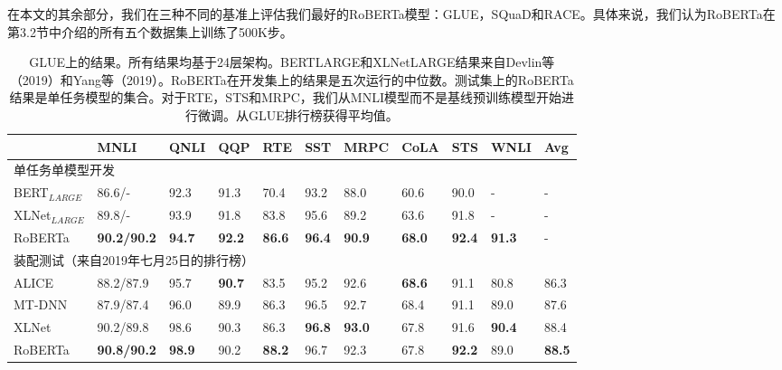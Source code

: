 \documentclass[lang=cn,11pt,a4paper,twocolumn]{elegantpaper}
\begin{document}
在本文的其余部分，我们在三种不同的基准上评估我们最好的RoBERTa模型：GLUE，SQuaD和RACE。具体来说，我们认为RoBERTa在第3.2节中介绍的所有五个数据集上训练了500K步。
\begin{table*}[]
  \centering
  \begin{tabular}{lllllllllll}
  \hline
  \textbf{}       & \textbf{MNLI}      & \textbf{QNLI} & \textbf{QQP}  & \textbf{RTE}  & \textbf{SST}  & \textbf{MRPC} & \textbf{CoLA} & \textbf{STS}  & \textbf{WNLI} & \textbf{Avg}  \\ \hline
  \multicolumn{11}{l}{单任务单模型开发}                                                                                                                                                        \\
  BERT$_{LARGE}$  & 86.6/-             & 92.3          & 91.3          & 70.4          & 93.2          & 88.0          & 60.6          & 90.0          & -             & -             \\
  XLNet$_{LARGE}$ & 89.8/-             & 93.9          & 91.8          & 83.8          & 95.6          & 89.2          & 63.6          & 91.8          & -             & -             \\
  RoBERTa         & \textbf{90.2/90.2} & \textbf{94.7} & \textbf{92.2} & \textbf{86.6} & \textbf{96.4} & \textbf{90.9} & \textbf{68.0} & \textbf{92.4} & \textbf{91.3} & -             \\ \hline
  \multicolumn{11}{l}{装配测试（来自2019年七月25日的排行榜）}                                                                                                                                          \\
  ALICE           & 88.2/87.9          & 95.7          & \textbf{90.7} & 83.5          & 95.2          & 92.6          & \textbf{68.6} & 91.1          & 80.8          & 86.3          \\
  MT-DNN          & 87.9/87.4          & 96.0          & 89.9          & 86.3          & 96.5          & 92.7          & 68.4          & 91.1          & 89.0          & 87.6          \\
  XLNet           & 90.2/89.8          & 98.6          & 90.3          & 86.3          & \textbf{96.8} & \textbf{93.0} & 67.8          & 91.6          & \textbf{90.4} & 88.4          \\
  RoBERTa         & \textbf{90.8/90.2} & \textbf{98.9} & 90.2          & \textbf{88.2} & 96.7          & 92.3          & 67.8          & \textbf{92.2} & 89.0          & \textbf{88.5} \\ \hline
  \end{tabular}
  \caption{GLUE上的结果。所有结果均基于24层架构。BERTLARGE和XLNetLARGE结果来自Devlin等（2019）和Yang等（2019）。RoBERTa在开发集上的结果是五次运行的中位数。测试集上的RoBERTa结果是单任务模型的集合。对于RTE，STS和MRPC，我们从MNLI模型而不是基线预训练模型开始进行微调。从GLUE排行榜获得平均值。}
\end{table*}
\end{document}
